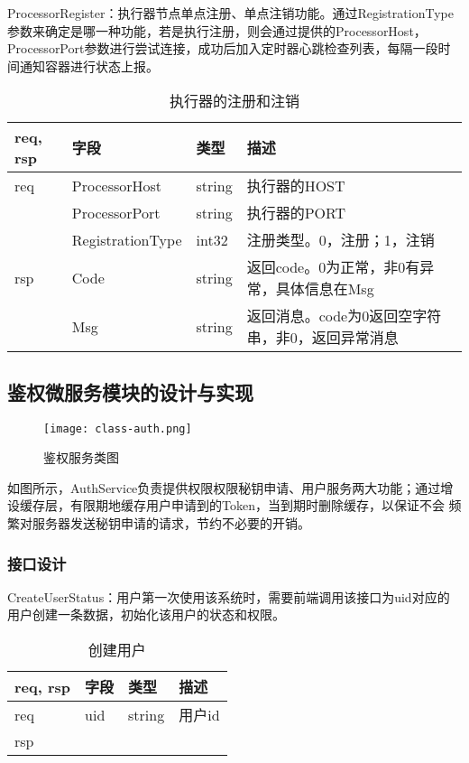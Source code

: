 ProcessorRegister：执行器节点单点注册、单点注销功能。通过RegistrationType参数来确定是哪一种功能，若是执行注册，则会通过提供的ProcessorHost，
ProcessorPort参数进行尝试连接，成功后加入定时器心跳检查列表，每隔一段时间通知容器进行状态上报。
    \begin{table}[H]
        \centering
        \caption{执行器的注册和注销}
        \label{tab:design-interface-processor-register}
        \begin{tabular}{llll}
            \toprule
            req, rsp   & 字段 & 类型 & 描述 \\
            \midrule
            req & ProcessorHost & string & 执行器的HOST\\
            & ProcessorPort & string & 执行器的PORT\\
            & RegistrationType & int32 & 注册类型。0，注册；1，注销 \\ \hline
            rsp & Code & string & 返回code。0为正常，非0有异常，具体信息在Msg\\
            & Msg & string & 返回消息。code为0返回空字符串，非0，返回异常消息\\
            \bottomrule
        \end{tabular}
    \end{table}




\subsection{鉴权微服务模块的设计与实现}


    \begin{figure}[H]
        \centering
        \texttt{[image: class-auth.png]}
        \caption{鉴权服务类图}
        \label{fig:jqfw}
    \end{figure}

    如图所示，AuthService负责提供权限权限秘钥申请、用户服务两大功能；通过增设缓存层，有限期地缓存用户申请到的Token，当到期时删除缓存，以保证不会
    频繁对服务器发送秘钥申请的请求，节约不必要的开销。

\subsubsection{接口设计}
CreateUserStatus：用户第一次使用该系统时，需要前端调用该接口为uid对应的用户创建一条数据，初始化该用户的状态和权限。
\begin{table}[H]
    \centering
    \caption{创建用户}
    \label{tab:design-interface-user-create}
    \begin{tabular}{llll}
        \toprule
        req, rsp   & 字段 & 类型 & 描述 \\
        \midrule
        req & uid & string & 用户id\\ \hline
        rsp & & & \\
        \bottomrule
    \end{tabular}
\end{table}

